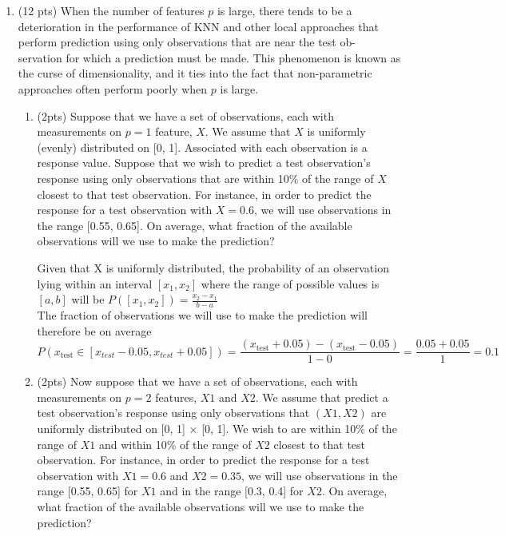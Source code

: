 \documentclass[a4paper]{article}
\theoremstyle{definition}
\newenvironment{soln}{
    \leavevmode\color{blue}\ignorespaces
}{}
\begin{document}
\begin{enumerate}
\begin{enumerate}
\end{enumerate}

\item (12 pts) When the number of features $p$ is large, there tends to be a deterioration in the performance of KNN and other local approaches that perform prediction using only observations that are near the test ob- servation for which a prediction must be made. This phenomenon is known as the curse of dimensionality, and it ties into the fact that non-parametric approaches often perform poorly when $p$ is large.

\begin{enumerate}
	\item (2pts) Suppose that we have a set of observations, each with measurements on $p=1$ feature, $X$. We assume that $X$ is uniformly (evenly) distributed on [0, 1]. Associated with each observation is a response value. Suppose that we wish to predict a test observation’s response using only observations that are within 10\% of the range of $X$ closest to that test observation. For instance, in order to predict the response for a test observation with $X=0.6$, we will use observations in the range [0.55, 0.65]. On average, what fraction of the available observations will we use to make the prediction?
	
	\begin{soln}  
            Given that X is  uniformly distributed, the probability of an observation lying within an interval $[x_1, x_2]$ where the range of possible values is $[a, b]$ will be $P([x_1, x_2]) = \frac{x_2 - x_1}{b - a}$
            \\ The fraction of observations we will use to make the prediction will therefore be on average $$P(x_{\text{test}} \in [x_{test}-0.05, x_{test}+0.05]) = \frac{(x_{\text{test}}+0.05) - (x_{\text{test}}-0.05)}{1 - 0} = \frac{0.05 + 0.05}{1} = 0.1$$
        \end{soln}
	
	
	\item (2pts) Now suppose that we have a set of observations, each with measurements on $p =2$ features, $X1$ and $X2$. We assume that predict a test observation’s response using only observations that $(X1,X2)$ are uniformly distributed on [0, 1] × [0, 1]. We wish to are within 10\% of the range of $X1$ and within 10\% of the range of $X2$ closest to that test observation. For instance, in order to predict the response for a test observation with $X1 =0.6$ and $X2 =0.35$, we will use observations in the range [0.55, 0.65] for $X1$ and in the range [0.3, 0.4] for $X2$. On average, what fraction of the available observations will we use to make the prediction?
	

\end{enumerate}
\end{enumerate}
\end{document}
